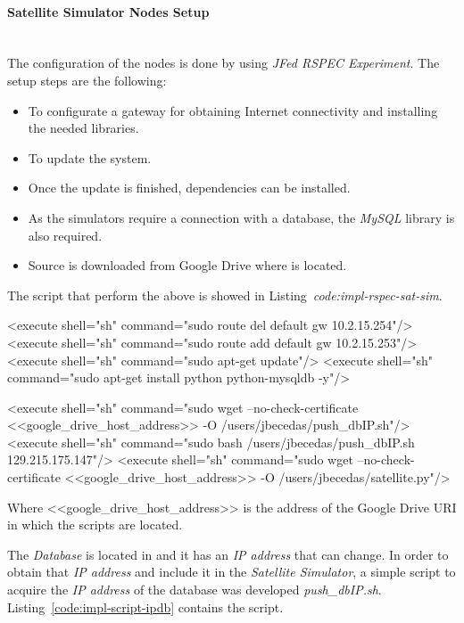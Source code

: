 \paragraph{Satellite Simulator Nodes Setup}~\\

The configuration of the nodes is done by using \emph{JFed RSPEC Experiment}. The
setup steps are the following:
\begin{itemize}
\item To configurate a gateway for obtaining Internet connectivity and installing the
  needed libraries.
\item To update the system.
\item Once the update is finished, dependencies can be installed.
\item As the simulators require a connection with a database, the \emph{MySQL} library is
  also required. 
\item Source is downloaded from Google Drive where is located.
\end{itemize}

The script that perform the above is showed in Listing~\emph{code:impl-rspec-sat-sim}.

\begin{listing}[
  float=h!,
  caption  = {RSPEC specification for \emph{Satellite Simulators}},
  label    = code:impl-rspec-sat-sim,
  style=customc]

<execute shell="sh" command="sudo route del default gw 10.2.15.254"/>
<execute shell="sh" command="sudo route add default gw 10.2.15.253"/>
<execute shell="sh" command="sudo apt-get update"/>
<execute shell="sh" command="sudo apt-get install python python-mysqldb -y"/>

<execute shell="sh" command="sudo wget --no-check-certificate <<google_drive_host_address>> -O
/users/jbecedas/push_dbIP.sh"/>
<execute shell="sh" command="sudo bash /users/jbecedas/push_dbIP.sh 129.215.175.147"/>
<execute shell="sh" command="sudo wget --no-check-certificate
<<google_drive_host_address>> -O /users/jbecedas/satellite.py"/>
\end{listing}


Where <<google\_drive\_host\_address>> is the address of the Google Drive URI in which the scripts are located.

The \emph{Database} is located in \bonfire and it has an \emph{IP address} that can change. In order to
obtain that \emph{IP address} and include it in the \emph{Satellite Simulator}, a simple script to
acquire the \emph{IP address} of the database was developed \emph{push\_dbIP.sh}.
Listing~\ref{code:impl-script-ipdb} contains the script.


